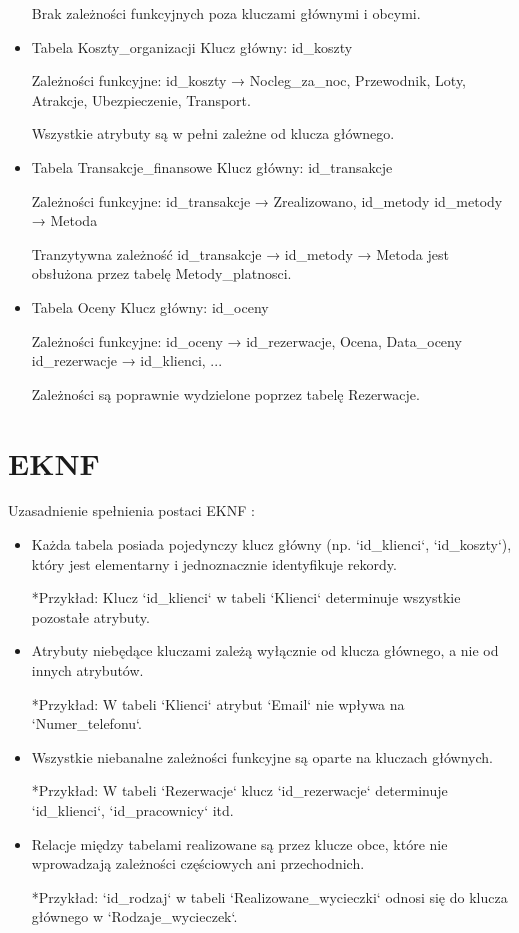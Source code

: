 \documentclass{article}
\theoremstyle{definition}
\begin{document}
\begin{itemize}
	Brak zależności funkcyjnych poza kluczami głównymi i obcymi. 
	
	\item Tabela Koszty\_organizacji
	Klucz główny: id\_koszty
	
	Zależności funkcyjne:
	id\_koszty → {Nocleg\_za\_noc, Przewodnik, Loty, Atrakcje, Ubezpieczenie, Transport}.
	
	Wszystkie atrybuty są w pełni zależne od klucza głównego.
	
	\item Tabela Transakcje\_finansowe
	Klucz główny: id\_transakcje
	
	Zależności funkcyjne:
	id\_transakcje → {Zrealizowano, id\_metody}
	id\_metody → Metoda 
	
	Tranzytywna zależność id\_transakcje → id\_metody → Metoda jest obsłużona przez tabelę Metody\_platnosci.
	
	\item Tabela Oceny
	Klucz główny: id\_oceny
	
	Zależności funkcyjne:
	id\_oceny → {id\_rezerwacje, Ocena, Data\_oceny}
	id\_rezerwacje → {id\_klienci, ...}
	
	Zależności są poprawnie wydzielone poprzez tabelę Rezerwacje.
	
	\end{itemize}

	\section{EKNF}
	Uzasadnienie spełnienia postaci EKNF :
	\begin{itemize}
	
	\item  Każda tabela posiada pojedynczy klucz główny (np. `id\_klienci`, `id\_koszty`), który jest elementarny i jednoznacznie identyfikuje rekordy. 
	 
	*Przykład: Klucz `id\_klienci` w tabeli `Klienci` determinuje wszystkie pozostałe atrybuty.
	
	\item  Atrybuty niebędące kluczami zależą wyłącznie od klucza głównego, a nie od innych atrybutów.  
	
	*Przykład: W tabeli `Klienci` atrybut `Email` nie wpływa na `Numer\_telefonu`.
	
	\item  Wszystkie niebanalne zależności funkcyjne są oparte na kluczach głównych.  
	
	*Przykład: W tabeli `Rezerwacje` klucz `id\_rezerwacje` determinuje `id\_klienci`, `id\_pracownicy` itd.
	
	\item  Relacje między tabelami realizowane są przez klucze obce, które nie wprowadzają zależności częściowych ani przechodnich.  
	
	*Przykład: `id\_rodzaj` w tabeli `Realizowane\_wycieczki` odnosi się do klucza głównego w `Rodzaje\_wycieczek`.
	
	\end{itemize}
\end{document}
